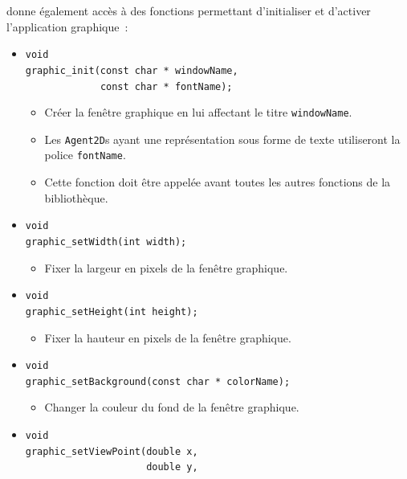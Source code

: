 \documentclass[12pt]{article}
\begin{document}
\vspace{-0.3cm}
donne \'egalement acc\`es \`a des fonctions
permettant d'initialiser et d'activer l'application graphique~:

\vspace{-0.2cm}
\begin{itemize}
\item \verb!void! \\
      \verb!graphic_init(const char * windowName,! \\
      \verb!             const char * fontName);!
      \begin{itemize}
      \item Cr\'eer la fen\^etre graphique en lui affectant le titre
            \verb!windowName!.
\vspace{-0.2cm}
      \item Les \verb!Agent2D!s ayant une repr\'esentation sous forme
            de texte utiliseront la police \verb!fontName!.
\vspace{-0.2cm}
      \item Cette fonction doit \^etre appel\'ee avant toutes les autres
            fonctions de la bi\-blio\-th\`eque.
      \end{itemize}
\item \verb!void! \\
      \verb!graphic_setWidth(int width);!
      \begin{itemize}
      \item Fixer la largeur en pixels de la fen\^etre graphique.
      \end{itemize}
\item \verb!void! \\
      \verb!graphic_setHeight(int height);!
      \begin{itemize}
      \item Fixer la hauteur en pixels de la fen\^etre graphique.
      \end{itemize}
\item \verb!void! \\
      \verb!graphic_setBackground(const char * colorName);!
      \begin{itemize}
      \item Changer la couleur du fond de la fen\^etre graphique.
      \end{itemize}
\item \verb!void! \\
      \verb!graphic_setViewPoint(double x,! \\
      \verb!                     double y,! \\

\end{itemize}
\end{document}
